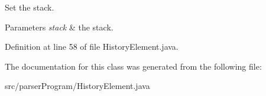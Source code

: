 Set the stack. 


\begin{DoxyParams}{Parameters}
{\em stack} & the stack. \\
\hline
\end{DoxyParams}


Definition at line 58 of file History\-Element.\-java.



The documentation for this class was generated from the following file\-:\begin{DoxyCompactItemize}
\item 
src/parser\-Program/History\-Element.\-java\end{DoxyCompactItemize}
